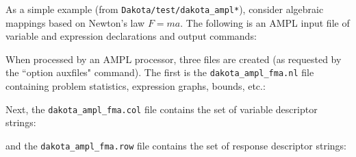 As a simple example (from \texttt{Dakota/test/dakota\_ampl*}), consider
algebraic mappings based on Newton's law $F = m a$.  The
following is an AMPL input file of variable and expression
declarations and output commands:
\begin{center}
\begin{bigbox}
\begin{small}
\end{small}
\end{bigbox}
\end{center}

When processed by an AMPL processor, three files are created (as
requested by the ``option auxfiles" command).  The first is the \texttt{dakota\_ampl\_fma.nl}
file containing problem statistics, expression graphs, bounds, etc.:
\begin{center}
\begin{bigbox}
\begin{small}
\end{small}
\end{bigbox}
\end{center}

Next, the \texttt{dakota\_ampl\_fma.col} file contains the set of variable
descriptor strings:
\begin{center}
\begin{bigbox}
\begin{small}
\end{small}
\end{bigbox}
\end{center}

and the \texttt{dakota\_ampl\_fma.row} file contains the set of response descriptor
strings:
\begin{center}
\begin{bigbox}
\begin{small}
\end{small}
\end{bigbox}
\end{center}

